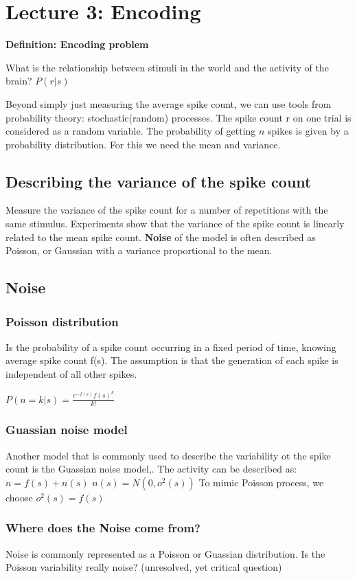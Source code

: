 \documentclass[11pt]{article}
\newcommand{\define}[2] {
  \textbf{Definition: #1}
  \begin{center} #2
\end{center}
}
\begin{document}
\section{Lecture 3: Encoding}
\define{Encoding problem}{What is the relationship between stimuli in the world and the activity of the brain? $P(r|s)$}

Beyond simply just measuring the average spike count, we can use tools from probability theory: stochastic(random) processes. The spike count r on one trial is considered as a random variable. The probability of getting $n$ spikes is given by a probability distribution. For this we need the mean and variance. 

\subsection{Describing the variance of the spike count}
Measure the variance of the spike count for a number of repetitions with the same stimulus. Experiments show that the variance of the spike count is linearly related to the mean spike count. \textbf{Noise} of the model is often described as Poisson, or Gaussian with a variance proportional to the mean.

\subsection{Noise}
\subsubsection{Poisson distribution}
Is the probability of a spike count occurring in a fixed period of time, knowing average spike count f(s). The assumption is that the generation of each spike is independent of all other spikes. 

$P(n = k | s) = \frac{e^{-f(s)}f(s)^k}{k!}$

\subsubsection{Guassian noise model}
Another model that is commonly used to describe the variability ot the spike count is the Guassian noise model,. The activity can be described as:
$n = f(s) + n(s)$
$n(s) = N(0, o^2(s))$
To mimic Poisson process, we choose $o^2(s) = f(s)$

\subsubsection{Where does the Noise come from?}
Noise is commonly represented as a Poisson or Guassian distribution. Is the Poisson variability really noise? (unresolved, yet critical question)
\end{document}
